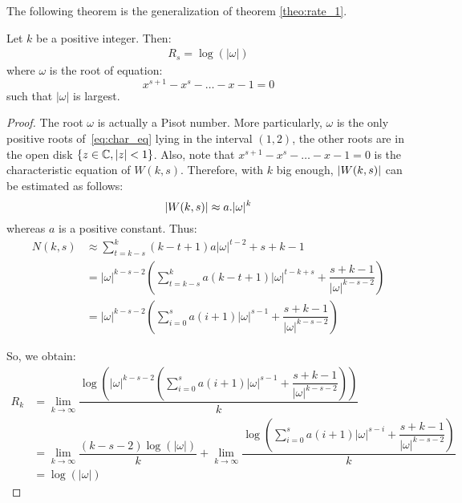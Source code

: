 The following theorem is the generalization of theorem \ref{theo:rate_1}.
\begin{theorem}\label{theo:rate_s}
    Let $k$ be a positive integer. Then:
    \begin{align}
        R_{s} = \log(\lvert\omega\rvert)
    \end{align}
    where $\omega$ is the root of equation: %
    \begin{equation}
        x^{s+1}-x^{s}-\ldots-x-1 = 0\label{eq:char_eq}
    \end{equation}
    such that $\lvert\omega\rvert$ is largest.
\end{theorem}
\begin{proof}
    
    The root $\omega$ is actually a Pisot number. More particularly, $\omega$ is the only positive roots of~\ref{eq:char_eq} lying in the interval $(1,2)$, the other roots are in the open disk $\left\{z\in\mathbb{C},\left \lvert z \right \rvert<1\right\}$. Also, note that $x^{s+1}-x^{s}-\ldots-x-1=0$ is the characteristic equation of $W(k,s)$. Therefore, with $k$ big enough, $\left \lvert W(k,s) \right \rvert$ can be estimated as follows: \[\left \lvert W(k,s) \right \rvert \approx a.\lvert\omega\rvert^{k}\] whereas $a$ is a positive constant. Thus:
    \begin{align*}
        N(k,s) &\approx \sum_{t=k-s}^{k}(k-t+1)a\lvert\omega\rvert^{t-2} + s + k - 1\\
        &= \lvert\omega\rvert^{k-s-2}\left( \sum_{t=k-s}^{k}a(k-t+1)\lvert\omega\rvert^{t-k+s} + \dfrac{s+k-1}{\lvert\omega\rvert^{k-s-2}}\right)\\
        &= \lvert\omega\rvert^{k-s-2}\left( \sum_{i=0}^{s}a(i+1)\lvert\omega\rvert^{s-1} + \dfrac{s+k-1}{\lvert\omega\rvert^{k-s-2}}\right) 
    \end{align*}

    So, we obtain:
    \begin{align*}
        R_{k} &= \lim_{k\to\infty}\dfrac{\log\left( \lvert\omega\rvert^{k-s-2}\left(\sum_{i=0}^{s}a(i+1)\lvert\omega\rvert^{s-1}+\dfrac{s+k-1}{\lvert\omega\rvert^{k-s-2}}\right)\right)}{k} \\
        &= \lim_{k\to\infty}\dfrac{(k-s-2)\log(\lvert\omega\rvert)}{k} + \lim_{k\to\infty}\dfrac{\log\left(\sum_{i=0}^{s}a(i+1)\lvert\omega\rvert^{s-i}+\dfrac{s+k-1}{\lvert\omega\rvert^{k-s-2}}\right)}{k}\\
        &= \log(\lvert\omega\rvert)
    \end{align*}
    
\end{proof}
